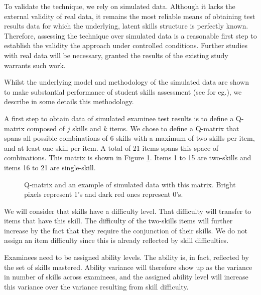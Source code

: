 To validate the technique, we rely on simulated data. Although it lacks the external validity of real data, it remains the most reliable means of obtaining test results data for which the underlying, latent skills structure is perfectly known. Therefore, assessing the technique over simulated data is a reasonable first step to establish the validity the approach under controlled conditions. Further studies with real data will be necessary, granted the results of the existing study warrants such work.

Whilst the underlying model and methodology of the simulated data are shown to make substantial performance of student skills assessment (see \citep{Desmarais2010a} for eg.), we describe in some details this methodology. 

A first step to obtain data of simulated examinee test results is to define a Q-matrix composed of $j$ skills and $k$ items. We chose to define a Q-matrix that spans all possible combinations of 6 skills with a maximum of two skills per item, and at least one skill per item. A total of 21 items spans this space of combinations. This matrix is shown in Figure \ref{figqmatrixandResutM}. Items 1 to 15 are two-skills and items 16 to 21 are single-skill. 

\begin{figure}[ht]
\centering

\quad
\caption{Q-matrix and an example of simulated data with this matrix.  Bright pixels represent 1's and dark red ones represent 0's.}
\label{figqmatrixandResutM}
\end{figure}


We will consider that skills have a difficulty level. That difficulty will transfer to items that have this skill. The difficulty of the two-skills items will further increase by the fact that they require the conjunction of their skills. We do not assign an item difficulty since this is already reflected by skill difficulties.

Examinees need to be assigned ability levels. The ability is, in fact, reflected by the set of skills mastered. Ability variance will therefore show up as the variance in number of skills across examinees, and the assigned ability level will increase this variance over the variance resulting from skill difficulty.

